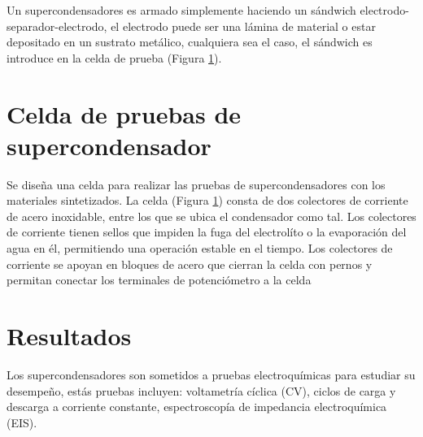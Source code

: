 Un supercondensadores es armado simplemente haciendo un sándwich electrodo-separador-electrodo, el electrodo puede ser una lámina de material o estar depositado en un sustrato metálico, cualquiera sea el caso, el sándwich es introduce en la celda de prueba (Figura \ref{fig:celda_de_pruebas_SC}). 

\section{Celda de pruebas de supercondensador}
Se diseña una celda para realizar las pruebas de supercondensadores con los materiales sintetizados. La celda (Figura \ref{fig:celda_de_pruebas_SC}) consta de dos colectores de corriente de acero inoxidable, entre los que se ubica el condensador como tal. Los colectores de corriente tienen sellos que impiden la fuga del electrolíto o la evaporación del agua en él, permitiendo una operación estable en el tiempo. Los colectores de corriente se apoyan en bloques de acero que cierran la celda con pernos y permitan conectar los terminales de potenciómetro a la celda

\begin{figure}[h!]
	\centering
	\label{fig:celda_de_pruebas_SC}
	\caption{}
\end{figure}


\section{Resultados}
Los supercondensadores son sometidos a pruebas electroquímicas para estudiar su desempeño, estás pruebas incluyen: voltametría cíclica (CV), ciclos de carga y descarga a corriente constante, espectroscopía de impedancia electroquímica (EIS).
